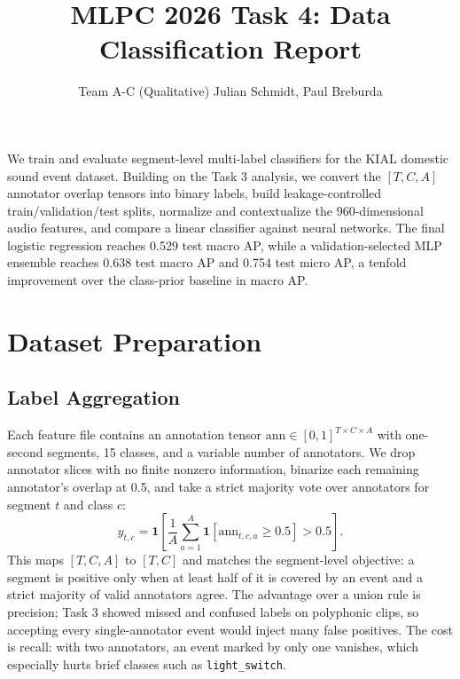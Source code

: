 \documentclass{article}
\title{MLPC 2026 Task 4: Data Classification Report}
\author{%
  Team A-C (Qualitative) \AND
  Julian Schmidt, Paul Breburda
}
\begin{document}
\maketitle

We train and evaluate segment-level multi-label classifiers for the KIAL domestic sound event dataset. Building on the Task 3 analysis, we convert the $[T,C,A]$ annotator overlap tensors into binary labels, build leakage-controlled train/validation/test splits, normalize and contextualize the 960-dimensional audio features, and compare a linear classifier against neural networks. The final logistic regression reaches 0.529 test macro AP, while a validation-selected MLP ensemble reaches 0.638 test macro AP and 0.754 test micro AP, a tenfold improvement over the class-prior baseline in macro AP.

\section{Dataset Preparation}

\subsection{Label Aggregation}

Each feature file contains an annotation tensor $\mathrm{ann}\in[0,1]^{T\times C\times A}$ with one-second segments, 15 classes, and a variable number of annotators. We drop annotator slices with no finite nonzero information, binarize each remaining annotator's overlap at 0.5, and take a strict majority vote over annotators for segment $t$ and class $c$:
\[
y_{t,c}=\mathbf{1}\!\left[
\frac{1}{A}\sum_{a=1}^{A}\mathbf{1}[\mathrm{ann}_{t,c,a}\geq 0.5] > 0.5
\right].
\]
This maps $[T,C,A]$ to $[T,C]$ and matches the segment-level objective: a segment is positive only when at least half of it is covered by an event and a strict majority of valid annotators agree. The advantage over a union rule is precision; Task 3 showed missed and confused labels on polyphonic clips, so accepting every single-annotator event would inject many false positives. The cost is recall: with two annotators, an event marked by only one vanishes, which especially hurts brief classes such as \texttt{light\_switch}.
\end{document}

